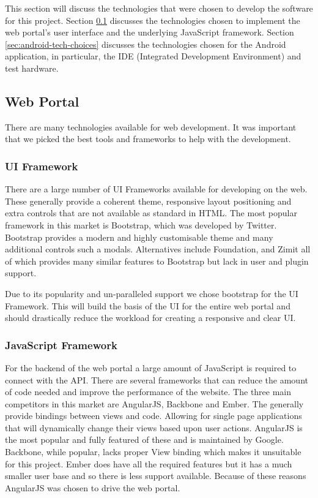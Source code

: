 \documentclass[11pt,a4paper]{article}
\begin{document}
This section will discuss the technologies that were chosen to develop the software for this project. Section \ref{sec:web-portal-tech-choices} discusses the technologies chosen to implement the web portal's user interface and the underlying JavaScript framework. Section \ref{sec:android-tech-choices} discusses the technologies chosen for the Android application, in particular, the IDE (Integrated Development Environment) and test hardware.

\subsection{Web Portal}
\label{sec:web-portal-tech-choices}
There are many technologies available for web development. It was important that we picked the best tools and frameworks to help with the development.

\subsubsection{UI Framework}
\label{sec:ui-framework}
There are a large number of UI Frameworks available for developing on the web. These generally provide a coherent theme, responsive layout positioning and extra controls that are not available as standard in HTML. The most popular framework in this market is Bootstrap\cite{bootstrap}, which was developed by Twitter. Bootstrap provides a modern and highly customisable theme and many additional controls such a modals. Alternatives include Foundation\cite{foundation}, and Zimit\cite{zimit} all of which provides many similar features to Bootstrap but lack in user and plugin support.

Due to its popularity and un-paralleled support we chose bootstrap for the UI Framework. This will build the basis of the UI for the entire web portal and should drastically reduce the workload for creating a responsive and clear UI.

\subsubsection{JavaScript Framework}
For the backend of the web portal a large amount of JavaScript is required to connect with the API. There are several frameworks that can reduce the amount of code needed and improve the performance of the website. The three main competitors in this market are AngularJS\cite{angular}, Backbone\cite{backbone} and Ember\cite{ember}. The generally provide bindings between views and code. Allowing for single page applications that will dynamically change their views based upon user actions. AngularJS is the most popular and fully featured of these and is maintained by Google. Backbone, while popular, lacks proper View binding which makes it unsuitable for this project. Ember does have all the required features but it has a much smaller user base and so there is less support available. Because of these reasons AngularJS was chosen to drive the web portal.
\end{document}
